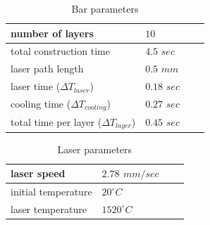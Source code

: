 \documentclass[3p]{article}
\begin{document}
\begin{table}[!h]
\centering
    \begin{tabular}{ | l | l | l | p{5cm} |}
    \hline
    number of layers & $10$\\ \hline
    total construction time & $4.5$ $sec$\\ \hline
    laser path length & $0.5$ $mm$\\  \hline
    laser time ($\Delta T_{laser}$) & $0.18$ $sec$\\  \hline
    cooling time ($\Delta T_{cooling}$) & $0.27$ $sec$\\  \hline
    total time per layer ($\Delta T_{layer}$) & $0.45$ $sec$\\  
    \hline
    \end{tabular}
\caption{Bar parameters}
\label{table::processParameters}
\end{table}

\begin{table}[!h]
\centering
    \begin{tabular}{ | l | l | l | p{5cm} |}
    \hline
    laser speed & $2.78$ ${mm}/{sec}$\\ \hline
    initial temperature & $20^{\circ}C$\\ \hline
    laser temperature & $1520^{\circ}C$\\ 
    \hline
    \end{tabular}
\caption{Laser parameters}
\label{table::laserParameters}
\end{table}



\end{document}
